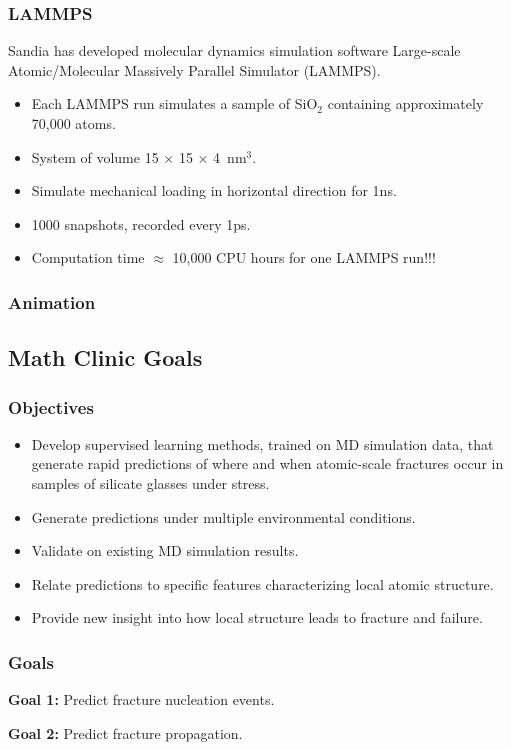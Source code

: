\frame
{
\frametitle{LAMMPS}
\begin{block}{} 

Sandia has developed molecular dynamics simulation software Large-scale Atomic/Molecular Massively Parallel Simulator (LAMMPS).

\begin{itemize}
    \item Each LAMMPS run simulates a sample of SiO$_2$ containing approximately 70,000 atoms.
    \item System of volume 15 $\times$ 15 $\times$ 4~nm$^3$.
    \item Simulate mechanical loading in horizontal direction for 1ns.
    \item 1000 snapshots, recorded every 1ps.
    \item Computation time $\approx$ 10,000 CPU hours for one LAMMPS run!!!
\end{itemize}
\end{block}
}



\frame
{
\frametitle{Animation}

}





\subsection{Math Clinic Goals}
\frame
{\frametitle{Objectives}
\begin{block}{}
\begin{itemize}
    \item Develop supervised learning methods, trained on MD simulation data, that generate rapid predictions of where and when atomic-scale fractures occur in samples of silicate glasses under stress. 

\item Generate predictions under multiple environmental conditions.

\item Validate on existing MD simulation results. 

\item Relate predictions to specific features characterizing local atomic structure.

\item Provide new insight into how local structure leads to fracture and failure.
\end{itemize}
\end{block}
}

\frame
{\frametitle{Goals}
\begin{block}{}

\textbf{Goal 1:} Predict fracture nucleation events.
\newline
\newline

\textbf{Goal 2:} Predict fracture propagation.

\end{block}
}